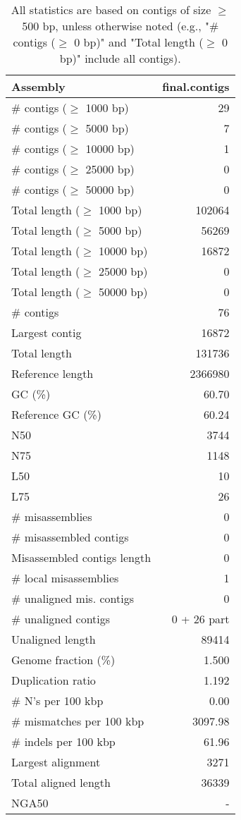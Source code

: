 \documentclass[12pt,a4paper]{article}
\begin{document}
\begin{table}[ht]
\begin{center}
\caption{All statistics are based on contigs of size $\geq$ 500 bp, unless otherwise noted (e.g., "\# contigs ($\geq$ 0 bp)" and "Total length ($\geq$ 0 bp)" include all contigs).}
\begin{tabular}{|l*{1}{|r}|}
\hline
Assembly & final.contigs \\ \hline
\# contigs ($\geq$ 1000 bp) & 29 \\ \hline
\# contigs ($\geq$ 5000 bp) & 7 \\ \hline
\# contigs ($\geq$ 10000 bp) & 1 \\ \hline
\# contigs ($\geq$ 25000 bp) & 0 \\ \hline
\# contigs ($\geq$ 50000 bp) & 0 \\ \hline
Total length ($\geq$ 1000 bp) & 102064 \\ \hline
Total length ($\geq$ 5000 bp) & 56269 \\ \hline
Total length ($\geq$ 10000 bp) & 16872 \\ \hline
Total length ($\geq$ 25000 bp) & 0 \\ \hline
Total length ($\geq$ 50000 bp) & 0 \\ \hline
\# contigs & 76 \\ \hline
Largest contig & 16872 \\ \hline
Total length & 131736 \\ \hline
Reference length & 2366980 \\ \hline
GC (\%) & 60.70 \\ \hline
Reference GC (\%) & 60.24 \\ \hline
N50 & 3744 \\ \hline
N75 & 1148 \\ \hline
L50 & 10 \\ \hline
L75 & 26 \\ \hline
\# misassemblies & 0 \\ \hline
\# misassembled contigs & 0 \\ \hline
Misassembled contigs length & 0 \\ \hline
\# local misassemblies & 1 \\ \hline
\# unaligned mis. contigs & 0 \\ \hline
\# unaligned contigs & 0 + 26 part \\ \hline
Unaligned length & 89414 \\ \hline
Genome fraction (\%) & 1.500 \\ \hline
Duplication ratio & 1.192 \\ \hline
\# N's per 100 kbp & 0.00 \\ \hline
\# mismatches per 100 kbp & 3097.98 \\ \hline
\# indels per 100 kbp & 61.96 \\ \hline
Largest alignment & 3271 \\ \hline
Total aligned length & 36339 \\ \hline
NGA50 & - \\ \hline
\end{tabular}
\end{center}
\end{table}
\end{document}
